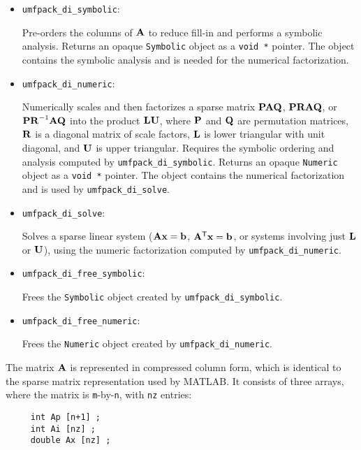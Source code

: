\documentclass[11pt]{article}
\newcommand{\m}[1]{{\bf{#1}}}       %
\newcommand{\tr}{^{\sf T}}          %
\begin{document}
\begin{itemize}
\item {\tt umfpack\_di\_symbolic}:

    Pre-orders the columns of $\m{A}$ to reduce fill-in and performs a
    symbolic analysis.
    Returns an opaque {\tt Symbolic} object as a {\tt void *}
    pointer.  The object contains the symbolic analysis and is needed for the
    numerical factorization.

\item {\tt umfpack\_di\_numeric}:

    Numerically scales and then factorizes a sparse matrix
    $\m{PAQ}$, $\m{PRAQ}$, or $\m{PR}^{-1}\m{AQ}$ into the product $\m{LU}$,
    where
    $\m{P}$ and $\m{Q}$ are permutation matrices, $\m{R}$ is a diagonal
    matrix of scale factors, $\m{L}$ is lower triangular with unit diagonal,
    and $\m{U}$ is upper triangular.  Requires the
    symbolic ordering and analysis computed by {\tt umfpack\_di\_symbolic}.
    Returns an opaque {\tt Numeric} object as a
    {\tt void *} pointer.  The object contains the numerical factorization and
    is used by {\tt umfpack\_di\_solve}.

\item {\tt umfpack\_di\_solve}:

    Solves a sparse linear system ($\m{Ax}=\m{b}$, $\m{A}\tr\m{x}=\m{b}$, or
    systems involving just $\m{L}$ or $\m{U}$), using the numeric factorization
    computed by {\tt umfpack\_di\_numeric}.

\item {\tt umfpack\_di\_free\_symbolic}:

    Frees the {\tt Symbolic} object created by {\tt umfpack\_di\_symbolic}.

\item {\tt umfpack\_di\_free\_numeric}:

    Frees the {\tt Numeric} object created by {\tt umfpack\_di\_numeric}.

\end{itemize}

The matrix $\m{A}$ is represented in compressed column form, which is
identical to the sparse matrix representation used by MATLAB.  It consists
of three arrays, where the matrix is {\tt m}-by-{\tt n},
with {\tt nz} entries:

{\footnotesize
\begin{verbatim}
     int Ap [n+1] ;
     int Ai [nz] ;
     double Ax [nz] ;
\end{verbatim}
}
\end{document}
